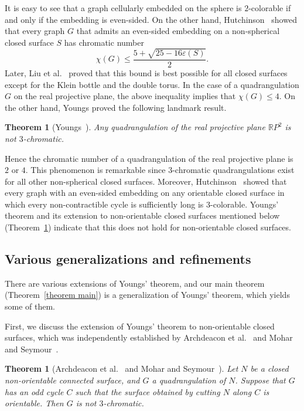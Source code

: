 \documentclass[11pt, amsfonts]{amsart}
\numberwithin{equation}{section}
\newtheorem{theorem}[thm]{Theorem}
\theoremstyle{definition}
\theoremstyle{remark}
\newcommand{\RR}{\mathbb{R}}
\begin{document}
It is easy to see that a graph cellularly embedded on the sphere is $2$-colorable if and only if the embedding is even-sided.
On the other hand, Hutchinson~\cite{Hutchinson1} showed that every graph $G$ that admits an even-sided embedding on a non-spherical closed surface $S$ has chromatic number
\[ \chi(G)\leq \dfrac{5+\sqrt{25-16\varepsilon(S)}}{2}.\]
Later, Liu et al.~\cite{Liuetal} proved that this bound is best possible for all closed surfaces except for the Klein bottle and the double torus.
In the case of a quadrangulation $G$ on the real projective plane, the above inequality implies that $\chi(G) \le 4$. On the other hand, Youngs proved the following landmark result.

\begin{theorem}[Youngs~\cite{Youngs}]\label{theorem:youngs}
Any quadrangulation of the real projective plane $\RR P^2$ is not $3$-chromatic.
\end{theorem}

Hence the chromatic number of a quadrangulation of the real projective plane is $2$ or $4$.
This phenomenon is remarkable since $3$-chromatic quadrangulations exist for all other non-spherical closed surfaces.
Moreover, Hutchinson~\cite{Hutchinson2} showed that every graph with an even-sided embedding on any orientable closed surface in which every non-contractible cycle is sufficiently long is $3$-colorable.
Youngs’ theorem and its extension to non-orientable closed surfaces mentioned below (Theorem~\ref{theorem:non-ori}) indicate that this does not hold for non-orientable closed surfaces.



\subsection{Various generalizations and refinements} \label{subsection generalizations}
There are various extensions of Youngs' theorem, and our main theorem (Theorem~\ref{theorem main}) is a generalization of Youngs' theorem, which yields some of them.

First, we discuss the extension of Youngs' theorem to non-orientable closed surfaces, which was independently established by Archdeacon et al.~\cite{AHNNO} and Mohar and Seymour~\cite{MS}.

\begin{theorem}[Archdeacon et al.~\cite{AHNNO} and Mohar and Seymour~\cite{MS}] \label{theorem:non-ori}
Let $N$ be a closed non-orientable connected surface, and $G$ a quadrangulation of $N$.
Suppose that $G$ has an odd cycle $C$ such that the surface obtained by cutting $N$ along $C$ is orientable.
Then $G$ is not $3$-chromatic.
\end{theorem}
\end{document}
